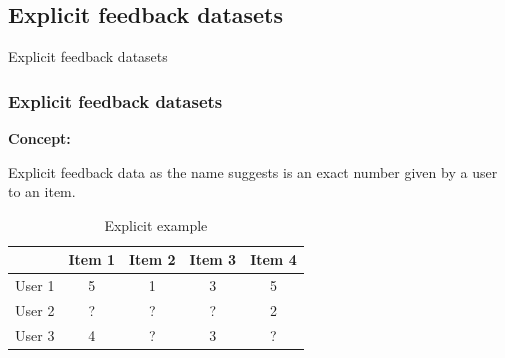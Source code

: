 \subsection{Explicit feedback datasets}

\begin{frame}{Explicit feedback datasets}
\frametitle{Explicit feedback datasets}
\hspace{-0.5cm}
{\Large \textbf{Concept:}\par}
\vspace{3mm}
Explicit feedback data as the name suggests is an exact number given by a user to an item.
\vspace{0.3cm}
\begin{center}
\begin{table}
    \centering
    \begin{tabular}{|c|c|c|c|c|} \hline
         & Item 1 & Item 2 & Item 3 & Item 4  \\ \hline
         User 1 & 5 & 1 & 3 & 5  \\ \hline
         User 2 &  ?  &  ?  &  ?  & 2   \\ \hline
         User 3 & 4 &  ?  & 3 &  ? \\ \hline
    \end{tabular}
    \caption{Explicit example}
\end{table}
\end{center}
\end{frame}

